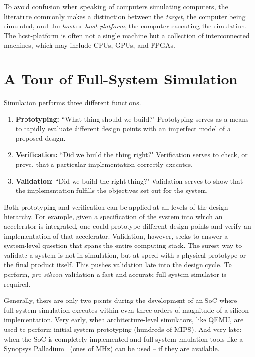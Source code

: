 To avoid confusion when speaking of computers simulating computers, the
literature commonly makes a distinction between the \emph{target}, the computer
being simulated, and the \emph{host} or \emph{host-platform}, the computer
executing the simulation. The host-platform is often not a single machine but
a collection of interconnected machines, which may include CPUs,
GPUs, and FPGAs.

\section{A Tour of Full-System Simulation}

Simulation performs three different functions.

\begin{enumerate}

    \item \textbf{Prototyping:} ``What thing should we
        build?" Prototyping serves as a means to rapidly evaluate different
        design points with an imperfect model of a proposed design.

    \item \textbf{Verification:} ``Did we build the thing right?" Verification
        serves to check, or prove, that a particular implementation
        correctly executes.

    \item \textbf{Validation:} ``Did we build the right thing?" Validation
        serves to show that the implementation fulfills the objectives set out
        for the system.

\end{enumerate}

Both prototyping and verification can be applied at all levels of the design
hierarchy.  For example, given a specification of the system into which an
accelerator is integrated, one could prototype different design points and
verify an implementation of that accelerator. Validation, however, seeks to
answer a system-level question that spans the entire computing stack.  The
surest way to validate a system is not in simulation, but at-speed with a
physical prototype or the final product itself. This pushes validation late
into the design cycle. To perform, \emph{pre-silicon} validation a fast and
accurate full-system simulator is required.

Generally, there are only two points during the development of an SoC where
full-system simulation executes within even three orders of magnitude of a
silicon implementation. Very early, when architecture-level simulators, like QEMU\cite{qemu}, are used
to perform initial system prototyping (hundreds of MIPS). And very late: when
the SoC is completely implemented and full-system emulation tools like a
Synopsys Palladium~\cite{palladium} (ones of MHz) can be used -- if they are
available.

